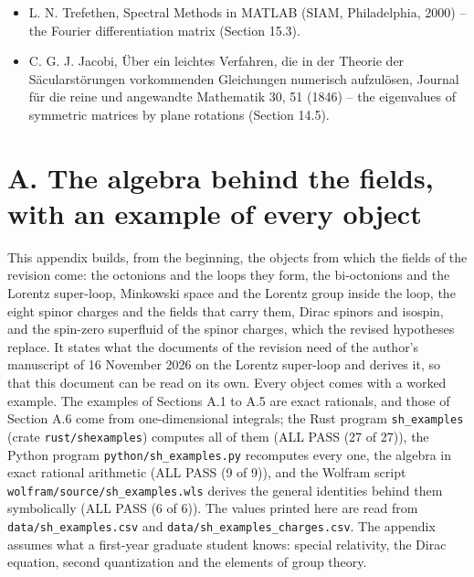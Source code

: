 \documentclass[
  10pt,
]{article}
\begin{document}
\begin{itemize}
  gap in superconductors, Soviet Physics JETP 38, 1018 (1974); R. A.
  Barankov, L. S. Levitov and B. Z. Spivak, Collective Rabi oscillations
  and solitons in a time-dependent BCS pairing problem, Physical Review
  Letters 93, 160401 (2004) -- the collisionless dynamics of a
  condensate (Section 15.1).
\item
  L. N. Trefethen, Spectral Methods in MATLAB (SIAM, Philadelphia, 2000)
  -- the Fourier differentiation matrix (Section 15.3).
\item
  C. G. J. Jacobi, Über ein leichtes Verfahren, die in der Theorie der
  Säcularstörungen vorkommenden Gleichungen numerisch aufzulösen,
  Journal für die reine und angewandte Mathematik 30, 51 (1846) -- the
  eigenvalues of symmetric matrices by plane rotations (Section 14.5).
\end{itemize}

\hypertarget{a.-the-algebra-behind-the-fields-with-an-example-of-every-object}{%
\section{A. The algebra behind the fields, with an example of every
object}\label{a.-the-algebra-behind-the-fields-with-an-example-of-every-object}}

This appendix builds, from the beginning, the objects from which the
fields of the revision come: the octonions and the loops they form, the
bi-octonions and the Lorentz super-loop, Minkowski space and the Lorentz
group inside the loop, the eight spinor charges and the fields that
carry them, Dirac spinors and isospin, and the spin-zero superfluid of
the spinor charges, which the revised hypotheses replace. It states what
the documents of the revision need of the author's manuscript of 16
November 2026 on the Lorentz super-loop and derives it, so that this
document can be read on its own. Every object comes with a worked
example. The examples of Sections A.1 to A.5 are exact rationals, and
those of Section A.6 come from one-dimensional integrals; the Rust
program \texttt{sh\_examples} (crate \texttt{rust/shexamples}) computes
all of them (ALL PASS (27 of 27)), the Python program
\texttt{python/sh\_examples.py} recomputes every one, the algebra in
exact rational arithmetic (ALL PASS (9 of 9)), and the Wolfram script
\texttt{wolfram/source/sh\_examples.wls} derives the general identities
behind them symbolically (ALL PASS (6 of 6)). The values printed here
are read from \texttt{data/sh\_examples.csv} and
\texttt{data/sh\_examples\_charges.csv}. The appendix assumes what a
first-year graduate student knows: special relativity, the Dirac
equation, second quantization and the elements of group theory.
\end{document}
